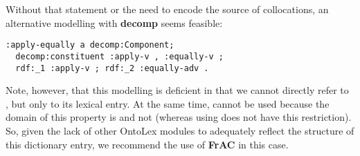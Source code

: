 \documentclass[output=paper,colorlinks,citecolor=brown]{langscibook}
\begin{document}
Without that statement or the need to encode the source of collocations, an alternative modelling with \textbf{decomp} seems feasible:

{\listingsize
\begin{verbatim}
:apply-equally a decomp:Component;
  decomp:constituent :apply-v , :equally-v ;
  rdf:_1 :apply-v ; rdf:_2 :equally-adv .
\end{verbatim}
}

\noindent
Note, however, that this modelling is deficient in that we cannot directly refer to , but only to its lexical entry.
At the same time,  cannot be used because the domain of this property is  and not  (whereas using  does not have this restriction).
So, given the lack of other OntoLex modules to adequately reflect the structure of this dictionary entry, we recommend the use of \textbf{FrAC} in this case.





\end{document}

